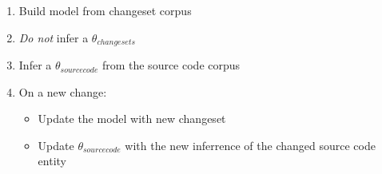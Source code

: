 %
\begin{enumerate}
    \item Build model from changeset corpus
    \item \emph{Do not} infer a $\theta_{changesets}$
    \item Infer a $\theta_{source code}$ from the source code corpus
    \item On a new change:
        \begin{itemize}
            \item Update the model with new changeset
            \item Update $\theta_{source code}$ with the new inferrence of the changed source code entity
        \end{itemize}
\end{enumerate}



